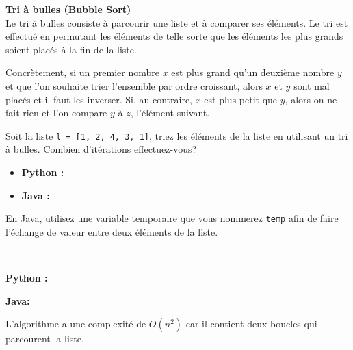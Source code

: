 \begin{Exercice} [20 minutes] \textbf{Tri à bulles (Bubble Sort)} \\
Le tri à bulles consiste à parcourir une liste et à comparer ses éléments. Le tri est effectué en permutant les éléments de telle sorte que les éléments les plus grands soient placés à la fin de la liste. 

Concrètement, si un premier nombre $x$ est plus grand qu'un deuxième nombre $y$ et que l'on souhaite trier l'ensemble par ordre croissant, alors $x$ et $y$ sont mal placés et il faut les inverser. Si, au contraire, $x$ est plus petit que $y$, alors on ne fait rien et l'on compare $y$ à $z$, l'élément suivant.

Soit la liste \lstinline{l = [1, 2, 4, 3, 1]}, triez les éléments de la liste en utilisant un tri à bulles. Combien d'itérations effectuez-vous?

\begin{itemize}
        \item \textbf{Python :}
             
        \item \textbf{Java :}
             
    \end{itemize}
    
    \begin{conseil}
    En Java, utilisez une variable temporaire que vous nommerez \lstinline{temp} afin de faire l'échange de valeur entre deux éléments de la liste.
    \end{conseil}
    
    \ \\
    
    \begin{solution}
    \textbf{Python :}
     
    \textbf{Java:}
     


    L'algorithme a une complexité de $O(n^2)$ car il contient deux boucles qui parcourent la liste.\\\\\\
            
\end{solution}
\end{Exercice}

